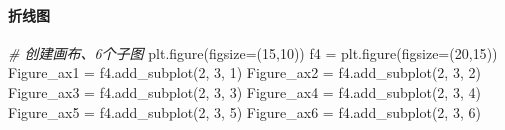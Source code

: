 \documentclass[
]{article}
\newenvironment{Shaded}{}{}
\newcommand{\CommentTok}[1]{\textcolor[rgb]{0.38,0.63,0.69}{\textit{#1}}}
\newcommand{\DecValTok}[1]{\textcolor[rgb]{0.25,0.63,0.44}{#1}}
\newcommand{\NormalTok}[1]{#1}
\newcommand{\OperatorTok}[1]{\textcolor[rgb]{0.40,0.40,0.40}{#1}}
\begin{document}
\hypertarget{header-n254}{%
\paragraph{折线图}\label{header-n254}}

\begin{Shaded}
\begin{Highlighting}[]
\CommentTok{\# 创建画布、6个子图}
\NormalTok{plt.figure(figsize}\OperatorTok{=}\NormalTok{(}\DecValTok{15}\NormalTok{,}\DecValTok{10}\NormalTok{))}
\NormalTok{f4 }\OperatorTok{=}\NormalTok{ plt.figure(figsize}\OperatorTok{=}\NormalTok{(}\DecValTok{20}\NormalTok{,}\DecValTok{15}\NormalTok{))}
\NormalTok{Figure\_ax1 }\OperatorTok{=}\NormalTok{ f4.add\_subplot(}\DecValTok{2}\NormalTok{, }\DecValTok{3}\NormalTok{, }\DecValTok{1}\NormalTok{)}
\NormalTok{Figure\_ax2 }\OperatorTok{=}\NormalTok{ f4.add\_subplot(}\DecValTok{2}\NormalTok{, }\DecValTok{3}\NormalTok{, }\DecValTok{2}\NormalTok{)}
\NormalTok{Figure\_ax3 }\OperatorTok{=}\NormalTok{ f4.add\_subplot(}\DecValTok{2}\NormalTok{, }\DecValTok{3}\NormalTok{, }\DecValTok{3}\NormalTok{)}
\NormalTok{Figure\_ax4 }\OperatorTok{=}\NormalTok{ f4.add\_subplot(}\DecValTok{2}\NormalTok{, }\DecValTok{3}\NormalTok{, }\DecValTok{4}\NormalTok{)}
\NormalTok{Figure\_ax5 }\OperatorTok{=}\NormalTok{ f4.add\_subplot(}\DecValTok{2}\NormalTok{, }\DecValTok{3}\NormalTok{, }\DecValTok{5}\NormalTok{)}
\NormalTok{Figure\_ax6 }\OperatorTok{=}\NormalTok{ f4.add\_subplot(}\DecValTok{2}\NormalTok{, }\DecValTok{3}\NormalTok{, }\DecValTok{6}\NormalTok{)}


\end{Highlighting}
\end{Shaded}
\end{document}
